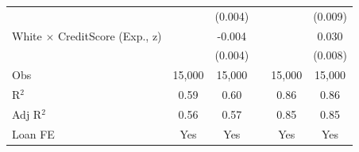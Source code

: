 {\begin{tabular}{l*{5}{c}}
                &                  &  (0.004)         &         &                  &  (0.009)         \\
White $\times$ CreditScore (Exp., z)&                  &   -0.004         &         &                  &    0.030\sym{***}\\
                &                  &  (0.004)         &         &                  &  (0.008)         \\
\midrule
Obs             &   15,000         &   15,000         &         &   15,000         &   15,000         \\
R$^2$           &     0.59         &     0.60         &         &     0.86         &     0.86         \\
Adj R$^2$       &     0.56         &     0.57         &         &     0.85         &     0.85         \\
Loan FE         &      Yes         &      Yes         &         &      Yes         &      Yes         \\
\bottomrule
\end{tabular}
}
